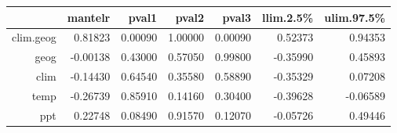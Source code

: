 \begin{table}[ht]
\centering
\begin{tabular}{rrrrrrr}
  \hline
 & mantelr & pval1 & pval2 & pval3 & llim.2.5\% & ulim.97.5\% \\ 
  \hline
clim.geog & 0.81823 & 0.00090 & 1.00000 & 0.00090 & 0.52373 & 0.94353 \\ 
  geog & -0.00138 & 0.43000 & 0.57050 & 0.99800 & -0.35990 & 0.45893 \\ 
  clim & -0.14430 & 0.64540 & 0.35580 & 0.58890 & -0.35329 & 0.07208 \\ 
  temp & -0.26739 & 0.85910 & 0.14160 & 0.30400 & -0.39628 & -0.06589 \\ 
  ppt & 0.22748 & 0.08490 & 0.91570 & 0.12070 & -0.05726 & 0.49446 \\ 
   \hline
\end{tabular}
\end{table}
